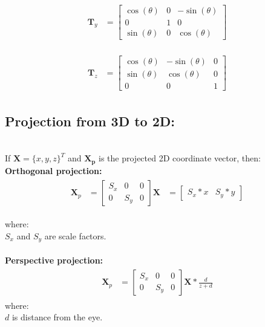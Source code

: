 \documentclass[10pt,b5paper,titlepage]{book}
\begin{document}
\begin{eqnarray}
    \begin{split}
        \mathbf{T}_y &=
        \begin{bmatrix}
            \cos(\theta) & 0 & -\sin(\theta) \\
            0 & 1 & 0 \\
            \sin(\theta) & 0 & \cos(\theta)
        \end{bmatrix}
    \end{split}
\end{eqnarray}

\begin{eqnarray}
    \begin{split}
        \mathbf{T}_z &=
        \begin{bmatrix}
            \cos(\theta) & -\sin(\theta) & 0 \\
            \sin(\theta) & \cos(\theta) & 0 \\
            0 & 0 & 1
        \end{bmatrix}
    \end{split}
\end{eqnarray}


\subsection{Projection from 3D to 2D:} \\

If $ \mathbf{X} = \{x, y, z\}^T $ and $ \mathbf{X_p} $ is the projected 2D coordinate vector, then: \\

\textbf{Orthogonal projection:} \\
\begin{eqnarray}
    \begin{split}
        \mathbf{X}_p &=
        \begin{bmatrix}
            S_x & 0 & 0 \\
            0 & S_y & 0
        \end{bmatrix}
        \mathbf{X}
        &=
        \begin{bmatrix}
            S_x * x & S_y * y
        \end{bmatrix}
    \end{split}
\end{eqnarray}

where: \\
$ S_x $ and $ S_y $ are scale factors. \\
\\
\textbf{Perspective projection:} \\
\begin{eqnarray}
    \begin{split}
        \mathbf{X}_p &=
        \begin{bmatrix}
            S_x & 0 & 0 \\
            0 & S_y & 0
        \end{bmatrix}
        \mathbf{X} * \frac{d}{z + d}
    \end{split}
\end{eqnarray}
where: \\
$ d $ is distance from the eye. \\
\end{document}
